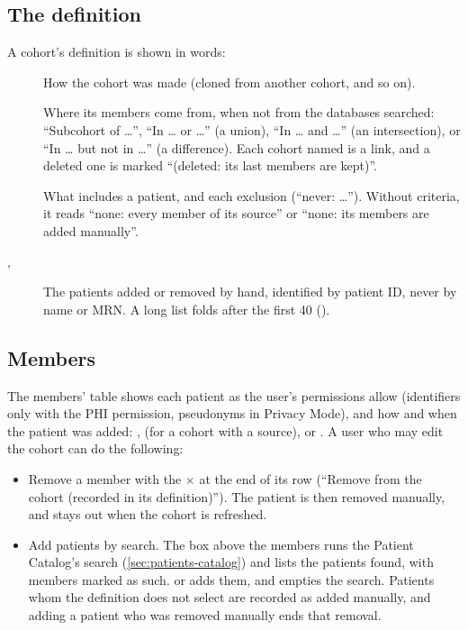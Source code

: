 \subsection{The definition}
\label{sec:cohorts-definition}

A cohort's definition is shown in words:
\begin{description}
\item[] How the cohort was made (cloned from another cohort, and so on).
\item[] Where its members come from, when not from the databases searched: ``Subcohort of
  \dots'', ``In \dots{} or \dots'' (a union), ``In \dots{} and \dots'' (an intersection), or ``In
  \dots{} but not in \dots'' (a difference). Each cohort named is a link, and a deleted one is
  marked ``(deleted: its last members are kept)''.
\item[] What includes a patient, and each exclusion (``never: \dots''). Without
  criteria, it reads ``none: every member of its source'' or ``none: its members are added
  manually''.
\item[, ] The patients added or removed by hand,
  identified by patient ID, never by name or MRN. A long list folds after the first 40 ().
\end{description}

\subsection{Members}
\label{sec:cohorts-members}

The members' table shows each patient as the user's permissions allow (identifiers only with
the PHI permission, pseudonyms in Privacy Mode), and how and when the patient was added:
,  (for a cohort with a source), or . A user who may edit the cohort can do the following:
\begin{itemize}
\item Remove a member with the $\times$ at the end of its row (``Remove from the cohort
  (recorded in its definition)''). The patient is then removed manually, and stays out when the
  cohort is refreshed.
\item Add patients by search. The box above the members runs the Patient Catalog's search
  (\cref{sec:patients-catalog}) and lists the patients found, with members marked as such.  or  adds them, and  empties the search.
  Patients whom the definition does not select are recorded as added manually, and adding a
  patient who was removed manually ends that removal.
\end{itemize}


